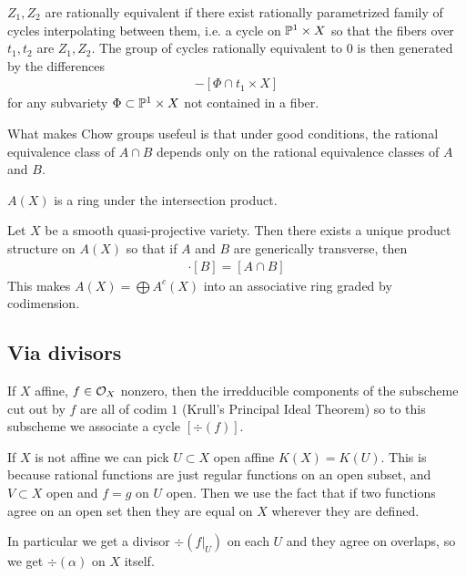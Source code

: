 \documentclass[12pt]{article}
\begin{document}
\begin{definition}
    $Z_1,Z_2$ are rationally equivalent if there exist rationally parametrized family of cycles 
    interpolating between them, i.e. a cycle on $\P^1\times X$ so that the fibers over $t_1,t_2$ are 
    $Z_1,Z_2$. The group of cycles rationally equivalent to $0$ is then generated by the differences \begin{align*}
        [\Phi \cap {t_0}\times X] - [\Phi\cap {t_1}\times X]
    \end{align*} for any subvariety $\Phi\subset \P^1\times X$ not contained in a fiber.
\end{definition}

\begin{remark}
    What makes Chow groups usefeul is that under good conditions, the rational
    equivalence class of $A\cap B$ depends only on the rational equivalence classes of $A$ and $B$.
\end{remark}

$A(X)$ is a ring under the intersection product. 
\begin{theorem}
    Let $X$ be a smooth quasi-projective variety. Then there exists a unique 
    product structure on $A(X)$ so that if $A$ and $B$ are generically transverse,
    then \begin{align*}
        [A]\cdot [B] = [A\cap B]
    \end{align*}
    This makes $A(X) = \bigoplus A^c(X)$ into an associative ring graded by codimension.
\end{theorem}

\subsection{Via divisors}
If $X$ affine, $f\in \cO_X$ nonzero, then the irredducible components of the subscheme cut out by $f$ 
are all of codim $1$ (Krull's Principal Ideal Theorem) so to this subscheme we associate a cycle $[\div(f)]$.

\hfill

If $X$ is not affine we can pick $U\subset X$ open affine $K(X) = K(U)$. This is 
because rational functions are just regular functions on an open subset, and
$V\subset X$ open and $f=g$ on $U$ open. Then we use the fact that if two functions 
agree on an open set then they are equal on $X$ wherever they are defined.

\hfill

In particular we get a divisor $\div(f\vert_U)$ on each $U$ and they agree on overlaps, 
so we get $\div(\alpha)$ on $X$ itself.
\end{document}
